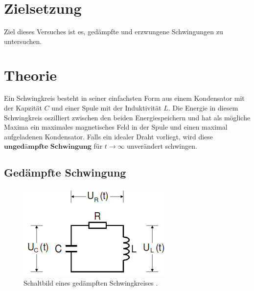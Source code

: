\maketitle
\tableofcontents
\newpage

\section{Zielsetzung}
Ziel dieses Versuches ist es, gedämpfte und erzwungene Schwingungen zu untersuchen.
\section{Theorie}
Ein Schwingkreis besteht in seiner einfachsten Form aus einem Kondensator mit der Kapzität
$C$ und einer Spule mit der Induktivität $L$. Die Energie in diesem Schwingkreis oszilliert
zwischen den beiden Energiespeichern und hat als mögliche Maxima ein maximales magnetisches
Feld in der Spule und einen maximal aufgeladenen Kondensator. Falls ein idealer Draht
vorliegt, wird diese $\textbf{ungedämpfte Schwingung}$ für $t \to \infty$ unverändert schwingen.
\subsection{Gedämpfte Schwingung}
\label{sec:gedaempfteSchwingung}
\begin{figure}
  \centering
  \includegraphics[scale=0.6]{gSchwingkreis.png}
  \caption{Schaltbild eines gedämpften Schwingkreises \cite{anleitung}.}
  \label{fig:1}
\end{figure}

